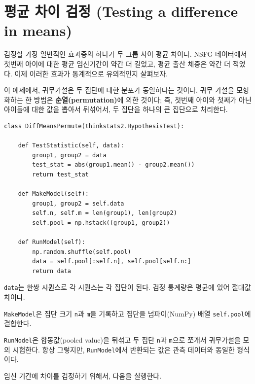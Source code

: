 \section{평균 차이 검정 (Testing a difference in means)}
\label{testdiff}

검정할 가장 일반적인 효과중의 하나가 두 그룹 사이 평균 차이다.
NSFG 데이터에서 첫번째 아이에 대한 평균 임신기간이 약간 더 길었고,
평균 출산 체중은 약간 더 적었다. 이제 이러한 효과가 통계적으로 유의적인지 살펴보자.


이 예제에서, 귀무가설은 두 집단에 대한 분포가 동일하다는 것이다.
귀무 가설을 모형화하는 한 방법은 {\bf 순열(permutation)}에 의한 것이다; 즉, 첫번째 아이와 첫째가 아닌 아이들에 대한 값을 뽑아서 뒤섞어서, 두 집단을 하나의 큰 집단으로 처리한다.


\begin{verbatim}
class DiffMeansPermute(thinkstats2.HypothesisTest):

    def TestStatistic(self, data):
        group1, group2 = data
        test_stat = abs(group1.mean() - group2.mean())
        return test_stat

    def MakeModel(self):
        group1, group2 = self.data
        self.n, self.m = len(group1), len(group2)
        self.pool = np.hstack((group1, group2))

    def RunModel(self):
        np.random.shuffle(self.pool)
        data = self.pool[:self.n], self.pool[self.n:]
        return data
\end{verbatim}

{\tt data}는 한쌍 시퀀스로 각 시퀀스는 각 집단이 된다.
검정 통계량은 평균에 있어 절대값 차이다.

{\tt MakeModel}은 집단 크기 {\tt n}과 {\tt m}을 기록하고
집단을 넘파이(NumPy) 배열 {\tt self.pool}에 결합한다.

{\tt RunModel}은 합동값(pooled value)을 뒤섞고 두 집단 {\tt n}과 {\tt m}으로 쪼개서 귀무가설을 모의 시험한다.
항상 그렇지만, {\tt RunModel}에서 반환되는 값은 관측 데이터와 동일한 형식이다.

임신 기간에 차이를 검정하기 위해서, 다음을 실행한다. 

